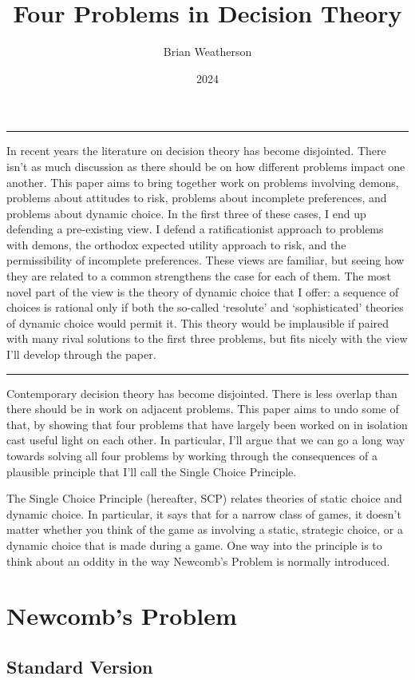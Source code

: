 \documentclass[
  10pt,
  letterpaper,
  DIV=11,
  numbers=noendperiod,
  twoside]{scrartcl}
\title{Four Problems in Decision Theory}
\author{Brian Weatherson}
\date{2024}
\renewenvironment{abstract}
 {\vspace{-1.25cm}
 \quotation\small\noindent\rule{\linewidth}{.5pt}\par\smallskip
 \noindent }
 {\par\noindent\rule{\linewidth}{.5pt}\endquotation}
\begin{document}
\maketitle
\begin{abstract}
In recent years the literature on decision theory has become disjointed.
There isn't as much discussion as there should be on how different
problems impact one another. This paper aims to bring together work on
problems involving demons, problems about attitudes to risk, problems
about incomplete preferences, and problems about dynamic choice. In the
first three of these cases, I end up defending a pre-existing view. I
defend a ratificationist approach to problems with demons, the orthodox
expected utility approach to risk, and the permissibility of incomplete
preferences. These views are familiar, but seeing how they are related
to a common strengthens the case for each of them. The most novel part
of the view is the theory of dynamic choice that I offer: a sequence of
choices is rational only if both the so-called `resolute' and
`sophisticated' theories of dynamic choice would permit it. This theory
would be implausible if paired with many rival solutions to the first
three problems, but fits nicely with the view I'll develop through the
paper.
\end{abstract}


Contemporary decision theory has become disjointed. There is less
overlap than there should be in work on adjacent problems. This paper
aims to undo some of that, by showing that four problems that have
largely been worked on in isolation cast useful light on each other. In
particular, I'll argue that we can go a long way towards solving all
four problems by working through the consequences of a plausible
principle that I'll call the Single Choice Principle.

The Single Choice Principle (hereafter, SCP) relates theories of static
choice and dynamic choice. In particular, it says that for a narrow
class of games, it doesn't matter whether you think of the game as
involving a static, strategic choice, or a dynamic choice that is made
during a game. One way into the principle is to think about an oddity in
the way Newcomb's Problem is normally introduced.

\section{Newcomb's Problem}\label{sec-newcomb}

\subsection{Standard Version}\label{sec-newcomb-standard}
\end{document}
